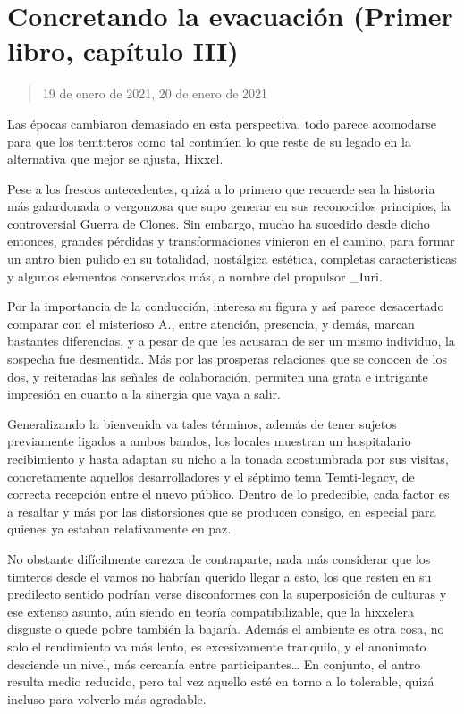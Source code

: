 \documentclass[
]{book}
\begin{document}
\hypertarget{concretando-la-evacuaciuxf3n-primer-libro-capuxedtulo-iii}{%
\section{Concretando la evacuación (Primer libro, capítulo III)}\label{concretando-la-evacuaciuxf3n-primer-libro-capuxedtulo-iii}}

\begin{quote}
19 de enero de 2021, 20 de enero de 2021
\end{quote}

Las épocas cambiaron demasiado en esta perspectiva, todo parece acomodarse para que los temtiteros como tal continúen lo que reste de su legado en la alternativa que mejor se ajusta, Hixxel.

Pese a los frescos antecedentes, quizá a lo primero que recuerde sea la historia más galardonada o vergonzosa que supo generar en sus reconocidos principios, la controversial Guerra de Clones. Sin embargo, mucho ha sucedido desde dicho entonces, grandes pérdidas y transformaciones vinieron en el camino, para formar un antro bien pulido en su totalidad, nostálgica estética, completas características y algunos elementos conservados más, a nombre del propulsor \_Iuri.

Por la importancia de la conducción, interesa su figura y así parece desacertado comparar con el misterioso A., entre atención, presencia, y demás, marcan bastantes diferencias, y a pesar de que les acusaran de ser un mismo individuo, la sospecha fue desmentida. Más por las prosperas relaciones que se conocen de los dos, y reiteradas las señales de colaboración, permiten una grata e intrigante impresión en cuanto a la sinergia que vaya a salir.

Generalizando la bienvenida va tales términos, además de tener sujetos previamente ligados a ambos bandos, los locales muestran un hospitalario recibimiento y hasta adaptan su nicho a la tonada acostumbrada por sus visitas, concretamente aquellos desarrolladores y el séptimo tema Temti-legacy, de correcta recepción entre el nuevo público. Dentro de lo predecible, cada factor es a resaltar y más por las distorsiones que se producen consigo, en especial para quienes ya estaban relativamente en paz.

No obstante difícilmente carezca de contraparte, nada más considerar que los timteros desde el vamos no habrían querido llegar a esto, los que resten en su predilecto sentido podrían verse disconformes con la superposición de culturas y ese extenso asunto, aún siendo en teoría compatibilizable, que la hixxelera disguste o quede pobre también la bajaría. Además el ambiente es otra cosa, no solo el rendimiento va más lento, es excesivamente tranquilo, y el anonimato desciende un nivel, más cercanía entre participantes\ldots{} En conjunto, el antro resulta medio reducido, pero tal vez aquello esté en torno a lo tolerable, quizá incluso para volverlo más agradable.
\end{document}
